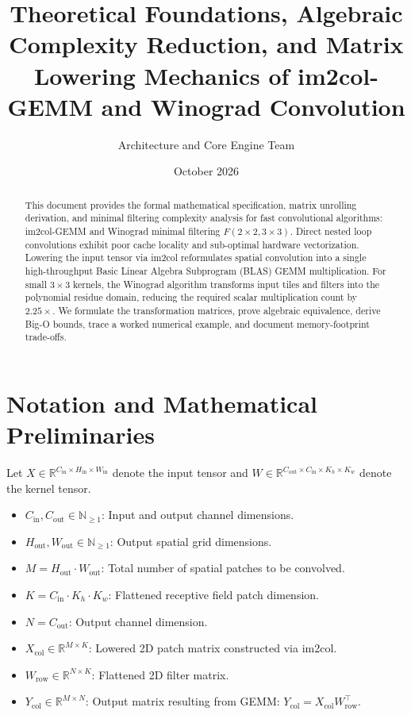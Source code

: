 \documentclass[11pt,a4paper]{article}
\title{\textbf{Theoretical Foundations, Algebraic Complexity Reduction, and Matrix Lowering Mechanics of im2col-GEMM and Winograd Convolution}}
\author{Architecture and Core Engine Team}
\date{October 2026}
\theoremstyle{definition}
\begin{document}
\maketitle

\begin{abstract}
This document provides the formal mathematical specification, matrix unrolling derivation, and minimal filtering complexity analysis for fast convolutional algorithms: im2col-GEMM and Winograd minimal filtering $F(2 \times 2, 3 \times 3)$. Direct nested loop convolutions exhibit poor cache locality and sub-optimal hardware vectorization. Lowering the input tensor via im2col reformulates spatial convolution into a single high-throughput Basic Linear Algebra Subprogram (BLAS) GEMM multiplication. For small $3 \times 3$ kernels, the Winograd algorithm transforms input tiles and filters into the polynomial residue domain, reducing the required scalar multiplication count by $2.25\times$. We formulate the transformation matrices, prove algebraic equivalence, derive Big-O bounds, trace a worked numerical example, and document memory-footprint trade-offs.
\end{abstract}

\section{Notation and Mathematical Preliminaries}

Let $X \in \mathbb{R}^{C_{\text{in}} \times H_{\text{in}} \times W_{\text{in}}}$ denote the input tensor and $W \in \mathbb{R}^{C_{\text{out}} \times C_{\text{in}} \times K_h \times K_w}$ denote the kernel tensor.

\begin{itemize}
    \item $C_{\text{in}}, C_{\text{out}} \in \mathbb{N}_{\ge 1}$: Input and output channel dimensions.
    \item $H_{\text{out}}, W_{\text{out}} \in \mathbb{N}_{\ge 1}$: Output spatial grid dimensions.
    \item $M = H_{\text{out}} \cdot W_{\text{out}}$: Total number of spatial patches to be convolved.
    \item $K = C_{\text{in}} \cdot K_h \cdot K_w$: Flattened receptive field patch dimension.
    \item $N = C_{\text{out}}$: Output channel dimension.
    \item $X_{\text{col}} \in \mathbb{R}^{M \times K}$: Lowered 2D patch matrix constructed via im2col.
    \item $W_{\text{row}} \in \mathbb{R}^{N \times K}$: Flattened 2D filter matrix.
    \item $Y_{\text{col}} \in \mathbb{R}^{M \times N}$: Output matrix resulting from GEMM: $Y_{\text{col}} = X_{\text{col}} W_{\text{row}}^\top$.
\end{itemize}
\end{document}

